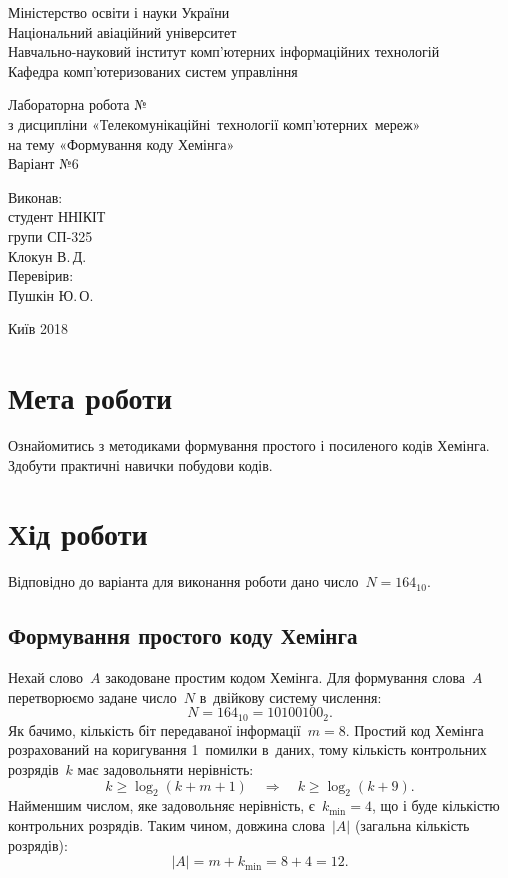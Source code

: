 \documentclass[
	a4paper,
	oneside,
	BCOR = 10mm,
	DIV = 12,
	12pt,
	headings = normal,
]{scrartcl}
\newcommand{\allcaps}[1]{{\addfontfeatures{LetterSpace = 8, Kerning = Off}#1}}
\begin{document}
\begin{titlepage}
		\begin{center}
			Міністерство освіти і науки України\\
			Національний авіаційний університет\\
			Навчально-науковий інститут комп'ютерних інформаційних технологій\\
			Кафедра комп'ютеризованих систем управління

			\vspace{\fill}
				Лабораторна робота №\\
				з дисципліни «Телекомунікаційні~технології комп'ютерних~мереж»\\
				на тему «Формування коду Хемінга»\\
				Варіант №6

			\vspace{\fill}

			\begin{flushright}
				Виконав:\\
				студент \allcaps{ННІКІТ}\\
				групи СП-325\\
				Клокун В.\,Д.\\
				Перевірив:\\
				Пушкін Ю.\,О.
			\end{flushright}

			Київ 2018
		\end{center}
	\end{titlepage}

	\section{Мета роботи}
		Ознайомитись з методиками формування простого і посиленого кодів Хемінга. Здобути практичні навички побудови кодів.
		
	\section{Хід роботи}
		Відповідно до варіанта для виконання роботи дано число~$N = 164_{10}$.

		\subsection{Формування простого коду Хемінга}
			Нехай слово~$A$ закодоване простим кодом Хемінга. Для формування слова~$A$ перетворюємо задане число~$N$ в~двійкову систему числення:
			\[
				N = 164_{10} = 10100100_{2}.
			\]
				Як бачимо, кількість біт передаваної інформації~$m = 8$. Простий код Хемінга розрахований на коригування 1~помилки в~даних, тому кількість контрольних розрядів~$k$ має задовольняти нерівність:
			\[
				k \geqslant \log_{2} (k + m + 1) \quad \Longrightarrow \quad k \geqslant \log_{2} (k + 9).
			\]
			Найменшим числом, яке задовольняє нерівність, є~$k_{\text{min}} = 4$, що і буде кількістю контрольних розрядів. Таким чином, довжина слова~$|A|$ (загальна кількість розрядів):
			\[
				|A| = m + k_{\text{min}} = 8 + 4 = 12.
			\]
\end{document}
